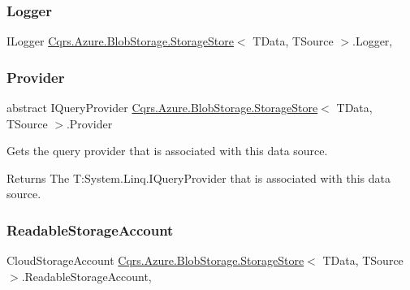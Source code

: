\subsubsection{\texorpdfstring{Logger}{Logger}}
{\footnotesize\ttfamily I\+Logger \hyperlink{classCqrs_1_1Azure_1_1BlobStorage_1_1StorageStore}{Cqrs.\+Azure.\+Blob\+Storage.\+Storage\+Store}$<$ T\+Data, T\+Source $>$.Logger\hspace{0.3cm}{\ttfamily [get]}, {\ttfamily [protected]}}

\mbox{\label{classCqrs_1_1Azure_1_1BlobStorage_1_1StorageStore_a3cc5fd841fb449ca365d05a52e8e8438}} 
\subsubsection{\texorpdfstring{Provider}{Provider}}
{\footnotesize\ttfamily abstract I\+Query\+Provider \hyperlink{classCqrs_1_1Azure_1_1BlobStorage_1_1StorageStore}{Cqrs.\+Azure.\+Blob\+Storage.\+Storage\+Store}$<$ T\+Data, T\+Source $>$.Provider\hspace{0.3cm}{\ttfamily [get]}}



Gets the query provider that is associated with this data source. 

\begin{DoxyReturn}{Returns}
The T\+:\+System.\+Linq.\+I\+Query\+Provider that is associated with this data source. 
\end{DoxyReturn}
\mbox{\label{classCqrs_1_1Azure_1_1BlobStorage_1_1StorageStore_af0e0bcba6758fda015f51b07eb464b14}} 
\subsubsection{\texorpdfstring{Readable\+Storage\+Account}{ReadableStorageAccount}}
{\footnotesize\ttfamily Cloud\+Storage\+Account \hyperlink{classCqrs_1_1Azure_1_1BlobStorage_1_1StorageStore}{Cqrs.\+Azure.\+Blob\+Storage.\+Storage\+Store}$<$ T\+Data, T\+Source $>$.Readable\+Storage\+Account\hspace{0.3cm}{\ttfamily [get]}, {\ttfamily [protected]}}

